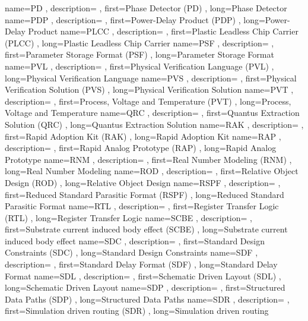 { name={PD}
, description={}
, first={Phase Detector (PD)}
, long={Phase Detector}
}
{ name={PDP}
, description={}
, first={Power-Delay Product (PDP)}
, long={Power-Delay Product}
}
{ name={PLCC}
, description={}
, first={Plastic Leadless Chip Carrier (PLCC)}
, long={Plastic Leadless Chip Carrier}
}
{ name={PSF}
, description={}
, first={Parameter Storage Format (PSF)}
, long={Parameter Storage Format}
}
{ name={PVL}
, description={}
, first={Physical Verification Language (PVL)}
, long={Physical Verification Language}
}
{ name={PVS}
, description={}
, first={Physical Verification Solution (PVS)}
, long={Physical Verification Solution}
}
{ name={PVT}
, description={}
, first={Process, Voltage and Temperature (PVT)}
, long={Process, Voltage and Temperature}
}
{ name={QRC}
, description={}
, first={Quantus Extraction Solution (QRC)}
, long={Quantus Extraction Solution}
}
{ name={RAK}
, description={}
, first={Rapid Adoption Kit (RAK)}
, long={Rapid Adoption Kit}
}
{ name={RAP}
, description={}
, first={Rapid Analog Prototype (RAP)}
, long={Rapid Analog Prototype}
}
{ name={RNM}
, description={}
, first={Real Number Modeling (RNM)}
, long={Real Number Modeling}
}
{ name={ROD}
, description={}
, first={Relative Object Design (ROD)}
, long={Relative Object Design}
}
{ name={RSPF}
, description={}
, first={Reduced Standard Parasitic Format (RSPF)}
, long={Reduced Standard Parasitic Format}
}
{ name={RTL}
, description={}
, first={Register Transfer Logic (RTL)}
, long={Register Transfer Logic}
}
{ name={SCBE}
, description={}
, first={Substrate current induced body effect (SCBE)}
, long={Substrate current induced body effect}
}
{ name={SDC}
, description={}
, first={Standard Design Constraints (SDC)}
, long={Standard Design Constraints}
}
{ name={SDF}
, description={}
, first={Standard Delay Format (SDF)}
, long={Standard Delay Format}
}
{ name={SDL}
, description={}
, first={Schematic Driven Layout (SDL)}
, long={Schematic Driven Layout}
}
{ name={SDP}
, description={}
, first={Structured Data Paths (SDP)}
, long={Structured Data Paths}
}
{ name={SDR}
, description={}
, first={Simulation driven routing (SDR)}
, long={Simulation driven routing}
}
